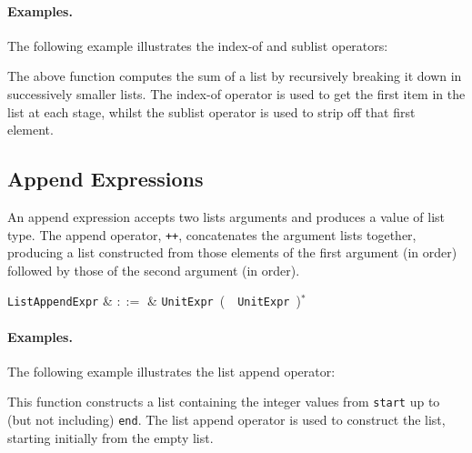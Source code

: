 \paragraph{Examples.} The following example illustrates the index-of and sublist operators:



The above function computes the sum of a list by recursively breaking it down in successively smaller lists.  The index-of operator is used to get the first item in the list at each stage, whilst the sublist operator is used to strip off that first element. 


\subsection{Append Expressions}
\label{c_expr_append}

An append expression accepts two lists arguments and produces a value of list type.  The append operator, \lstinline{++}, concatenates the argument lists together, producing a list constructed from those elements of the first argument (in order) followed by those of the second argument (in order).

\begin{syntax}
  \verb+ListAppendExpr+ & $::=$ & \verb+UnitExpr+\ \big(\ \token{++}\
  \verb+UnitExpr+\ \big)$^*$\\
\end{syntax}

\paragraph{Examples.} The following example illustrates the list append operator:



This function constructs a list containing the integer values from \lstinline{start} up to (but not including) \lstinline{end}.  The list append operator is used to construct the list, starting initially from the empty list.


